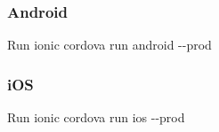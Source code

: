 \subsubsection*{Android}


\begin{DoxyEnumerate}
\item Run {\ttfamily ionic cordova run android -\/-\/prod}
\end{DoxyEnumerate}

\subsubsection*{i\+OS}


\begin{DoxyEnumerate}
\item Run {\ttfamily ionic cordova run ios -\/-\/prod} 
\end{DoxyEnumerate}